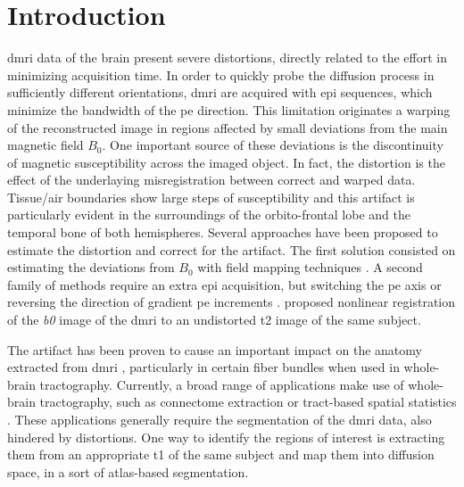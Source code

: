 \section{Introduction}\label{sec:introduction}

\Gls*{dmri} data of the brain present severe distortions, directly related to the
  effort in minimizing acquisition time.
In order to quickly probe the diffusion process in sufficiently different orientations,
  \gls*{dmri} are acquired with \gls*{epi} sequences, which minimize the bandwidth of the \gls*{pe}
  direction.
This limitation originates a warping of the reconstructed image in regions affected by
  small deviations from the main magnetic field $B_0$.
One important source of these deviations is the discontinuity of magnetic susceptibility across
  the imaged object.
In fact, the distortion is the effect of the underlaying misregistration between correct and
  warped data.
Tissue/air boundaries show large steps of susceptibility and this artifact is
  particularly evident in the surroundings of the orbito-frontal lobe and the temporal
  bone of both hemispheres.
Several approaches have been proposed to estimate the distortion and correct
  for the artifact.
The first solution consisted on estimating the deviations from $B_0$ with field mapping
  techniques \citep{andersson_modeling_2001}.
A second family of methods require an extra \gls*{epi} acquisition, but switching
  the \gls*{pe} axis \citep{chiou_simple_2000} or reversing the direction of gradient \gls*{pe}
  increments \citep{cordes_geometric_2000,holland_efficient_2010}.
\cite{kybic_unwarping_2000} proposed nonlinear registration of the \emph{b0}
  image of the \gls*{dmri} to an undistorted \gls*{t2} image of
   the same subject.

The artifact has been proven to cause an important impact on the anatomy extracted
  from \gls*{dmri} \citep{irfanoglu_effects_2012}, particularly in certain fiber bundles
  when used in whole-brain tractography.
Currently, a broad range of applications make use of whole-brain tractography, such as
  connectome extraction \citep{craddock_imaging_2013} or tract-based spatial statistics
  \citep{smith_tractbased_2006}.
These applications generally require the segmentation of the \gls*{dmri} data, also
  hindered by distortions.
One way to identify the regions of interest is extracting them from an appropriate 
  \gls*{t1} of the same subject and map them into diffusion space,
  in a sort of atlas-based segmentation.

